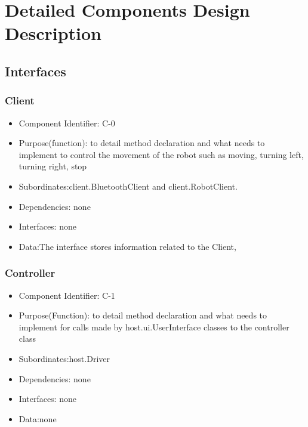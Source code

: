 \documentclass[11pt, a4paper]{report}
\begin{document}
\section{Detailed Components Design Description}
\subsection{Interfaces}
\subsubsection{Client}
\begin{itemize}
\item Component Identifier: C-0
\item Purpose(function): to detail method declaration and what needs to implement
to control the movement of the robot such as moving, turning left, turning right, stop
\item Subordinates:client.BluetoothClient and client.RobotClient.
\item Dependencies: none
\item Interfaces: none
\item Data:The interface stores information related to the Client, %
\end{itemize}

\subsubsection{Controller}
\begin{itemize}
\item Component Identifier: C-1
\item Purpose(Function): to detail method declaration and what needs to implement
for calls made by host.ui.UserInterface classes to the controller class
\item Subordinates:host.Driver
\item Dependencies: none
\item Interfaces: none
\item Data:none
\end{itemize}
\end{document}
